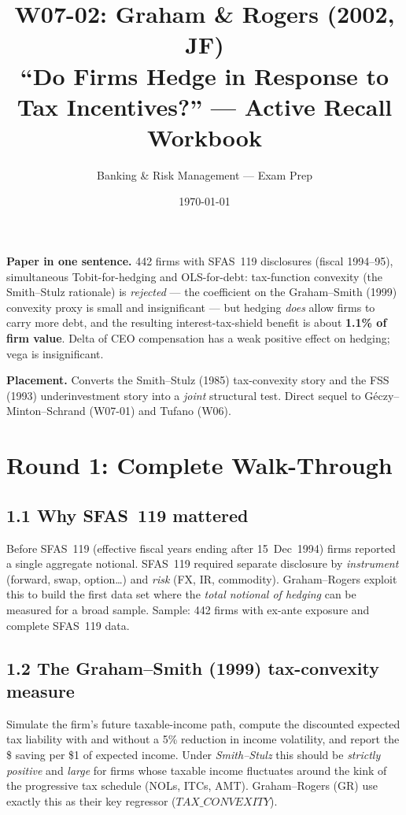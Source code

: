 \documentclass[11pt]{article}
\title{W07-02: Graham \& Rogers (2002, JF) \\
\large ``Do Firms Hedge in Response to Tax Incentives?'' --- Active Recall Workbook}
\author{Banking \& Risk Management --- Exam Prep}
\date{\today}
\begin{document}
\maketitle

\begin{keybox}
\textbf{Paper in one sentence.} 442 firms with SFAS~119 disclosures (fiscal 1994--95), simultaneous Tobit-for-hedging and OLS-for-debt: tax-function convexity (the Smith--Stulz rationale) is \emph{rejected} --- the coefficient on the Graham--Smith (1999) convexity proxy is small and insignificant --- but hedging \emph{does} allow firms to carry more debt, and the resulting interest-tax-shield benefit is about \textbf{1.1\% of firm value}. Delta of CEO compensation has a weak positive effect on hedging; vega is insignificant.

\textbf{Placement.} Converts the Smith--Stulz (1985) tax-convexity story and the FSS (1993) underinvestment story into a \emph{joint} structural test. Direct sequel to G\'eczy--Minton--Schrand (W07-01) and Tufano (W06).
\end{keybox}

\section*{Round 1: Complete Walk-Through}

\subsection*{1.1 Why SFAS~119 mattered}
Before SFAS~119 (effective fiscal years ending after 15~Dec~1994) firms reported a single aggregate notional. SFAS~119 required separate disclosure by \emph{instrument} (forward, swap, option\ldots) and \emph{risk} (FX, IR, commodity). Graham--Rogers exploit this to build the first data set where the \emph{total notional of hedging} can be measured for a broad sample. Sample: 442 firms with ex-ante exposure and complete SFAS~119 data.

\subsection*{1.2 The Graham--Smith (1999) tax-convexity measure}
Simulate the firm's future taxable-income path, compute the discounted expected tax liability with and without a 5\% reduction in income volatility, and report the \$ saving per \$1 of expected income. Under \emph{Smith--Stulz} this should be \emph{strictly positive} and \emph{large} for firms whose taxable income fluctuates around the kink of the progressive tax schedule (NOLs, ITCs, AMT). Graham--Rogers (GR) use exactly this as their key regressor (\(TAX\_CONVEXITY\)).
\end{document}
